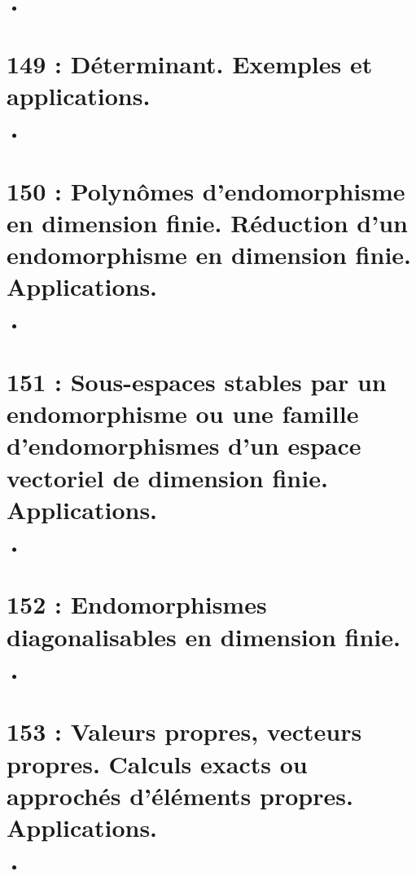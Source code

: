 \documentclass[a4paper,10pt,oneside,twocolumn,landscape]{book}
\begin{document}
\begin{itemize}
	\item
\end{itemize}


\section{149 : Déterminant. Exemples et applications.}

\begin{itemize}
	\item 
\end{itemize}


\section{150 : Polynômes d’endomorphisme en dimension finie. Réduction d’un endomorphisme en dimension finie. Applications.}

\begin{itemize}
	\item 
\end{itemize}

\section{151 : Sous-espaces stables par un endomorphisme ou une famille d’endomorphismes d’un espace vectoriel de dimension finie. Applications.}

\begin{itemize}
	\item 
\end{itemize}

\section{152 : Endomorphismes diagonalisables en dimension finie.}

\begin{itemize}
	\item 
\end{itemize}

\section{153 : Valeurs propres, vecteurs propres. Calculs exacts ou approchés d’éléments
	propres. Applications.}

\begin{itemize}
	\item 
\end{itemize}
\end{document}
